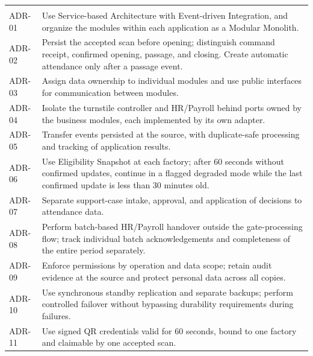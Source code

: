 \begin{longtable}{|>{\raggedright\arraybackslash}p{46pt}|>{\raggedright\arraybackslash}p{381pt}|}
\hline
\multicolumn{1}{|>{\columncolor{tableheader}\centering\arraybackslash}p{46pt}|}{\textbf{ID}} & \multicolumn{1}{>{\columncolor{tableheader}\centering\arraybackslash}p{381pt}|}{\textbf{Decision}} \\
\hline
\endhead
\multicolumn{2}{c}{\rule{0pt}{20pt}\normalsize\textbf{Table 6.1. TMC Architecture Decision Log}} \\
\endlastfoot
ADR-01 & Use Service-based Architecture with Event-driven Integration, and organize the modules within each application as a Modular Monolith. \\
\hline
ADR-02 & Persist the accepted scan before opening; distinguish command receipt, confirmed opening, passage, and closing. Create automatic attendance only after a passage event. \\
\hline
ADR-03 & Assign data ownership to individual modules and use public interfaces for communication between modules. \\
\hline
ADR-04 & Isolate the turnstile controller and HR/Payroll behind ports owned by the business modules, each implemented by its own adapter. \\
\hline
ADR-05 & Transfer events persisted at the source, with duplicate-safe processing and tracking of application results. \\
\hline
ADR-06 & Use Eligibility Snapshot at each factory; after 60 seconds without confirmed updates, continue in a flagged degraded mode while the last confirmed update is less than 30 minutes old. \\
\hline
ADR-07 & Separate support-case intake, approval, and application of decisions to attendance data. \\
\hline
ADR-08 & Perform batch-based HR/Payroll handover outside the gate-processing flow; track individual batch acknowledgements and completeness of the entire period separately. \\
\hline
ADR-09 & Enforce permissions by operation and data scope; retain audit evidence at the source and protect personal data across all copies. \\
\hline
ADR-10 & Use synchronous standby replication and separate backups; perform controlled failover without bypassing durability requirements during failures. \\*
\hline\noalign{\nobreak}
ADR-11 & Use signed QR credentials valid for 60 seconds, bound to one factory and claimable by one accepted scan. \\
\hline
\end{longtable}


